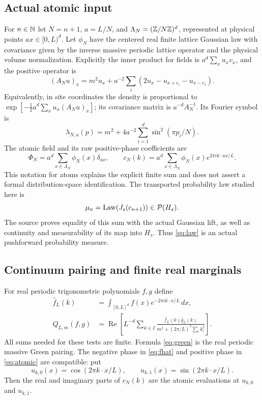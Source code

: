 \documentclass[11pt]{amsart}
\theoremstyle{remark}\newtheorem{remark}[theorem]{Remark}
\begin{document}
\subsection{Actual atomic input}
For $n\in\mathbb N$ let $N=n+1$, $a=L/N$, and $\Lambda_N=(\mathbb Z/N\mathbb Z)^d$, represented at physical points $ax\in[0,L)^d$. Let $\phi_N$ have the centered real finite lattice Gaussian law with covariance given by the inverse massive periodic lattice operator and the physical volume normalization. Explicitly the inner product for fields is $a^d\sum_x u_xv_x$, and the positive operator is
\[
 (A_Nu)_x=m^2u_x+a^{-2}\sum_i(2u_x-u_{x+e_i}-u_{x-e_i}).
\]
Equivalently, in site coordinates the density is proportional to
$\exp[-\tfrac12 a^d\sum_x u_x(A_Nu)_x]$; its covariance matrix is $a^{-d}A_N^{-1}$. Its Fourier symbol is
\begin{equation}\label{eq:symbol}
 \lambda_{N,a}(p)=m^2+4a^{-2}\sum_{i=1}^d\sin^2(\pi p_i/N).
\end{equation}
The atomic field and its raw positive-phase coefficients are
\begin{equation}\label{eq:atomic}
 \Phi_N=a^d\sum_{x\in\Lambda_N}\phi_N(x)\delta_{ax},\qquad
 c_N(k)=a^d\sum_{x\in\Lambda_N}\phi_N(x)e^{2\pi i k\cdot ax/L}.
\end{equation}
This notation for atoms explains the explicit finite sum and does not assert a formal distribution-space identification. The transported probability law studied here is
\begin{equation}\label{eq:law}
 \mu_n=\operatorname{Law}(J_s(c_{n+1}))\in\mathcal P(H_s).
\end{equation}
The source proves equality of this sum with the actual Gaussian lift, as well as continuity and measurability of its map into $H_s$. Thus \eqref{eq:law} is an actual pushforward probability measure.

\subsection{Continuum pairing and finite real marginals}
For real periodic trigonometric polynomials $f,g$ define
\begin{align}
 \widehat f_L(k)&=\int_{[0,L]^d}f(x)e^{-2\pi i k\cdot x/L}\,dx,\label{eq:fhat}\\
 Q_{L,m}(f,g)&=\operatorname{Re}\left[
 L^{-d}\sum_{k\in I}
 \frac{\overline{\widehat f_L(k)}\widehat g_L(k)}
 {m^2+(2\pi/L)^2\sum_i k_i^2}\right].\label{eq:green}
\end{align}
All sums needed for these tests are finite. Formula \eqref{eq:green} is the real periodic massive Green pairing. The negative phase in \eqref{eq:fhat} and positive phase in \eqref{eq:atomic} are compatible: put
\[
 u_{k,0}(x)=\cos(2\pi k\cdot x/L),\qquad
 u_{k,1}(x)=\sin(2\pi k\cdot x/L).
\]
Then the real and imaginary parts of $c_N(k)$ are the atomic evaluations at $u_{k,0}$ and $u_{k,1}$.
\end{document}
